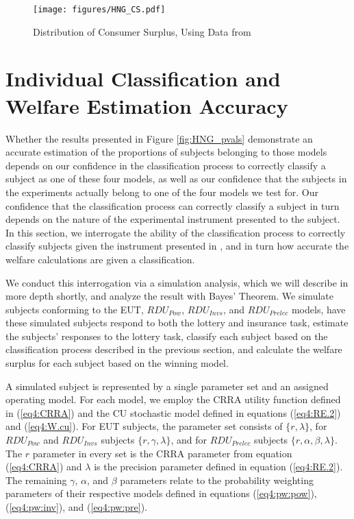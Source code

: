 \documentclass[11pt,a4paper]{report}
\newcommand{\onlyinsubfile}[1]{#1}
\newcommand{\notinsubfile}[1]{}
\begin{document}
\begin{figure}[h!]
	\center
	\caption{Distribution of Consumer Surplus, Using Data from \textcite{Harrison2016}}
	\onlyinsubfile{
		\texttt{[image: figures/HNG\_CS.pdf]}
	}
	\notinsubfile{
		\texttt{[image: ch4/figures/HNG\_CS.pdf]}
	}
	\label{fig:HNG_CS}
\end{figure}

\section{Individual Classification and Welfare Estimation Accuracy}

Whether the results presented in Figure \ref{fig:HNG_pvals} demonstrate an accurate estimation of the proportions of subjects belonging to those models depends on our confidence in the classification process to correctly classify a subject as one of these four models, as well as our confidence that the subjects in the experiments actually belong to one of the four models we test for.
Our confidence that the classification process can correctly classify a subject in turn depends on the nature of the experimental instrument presented to the subject.
In this section, we interrogate the ability of the classification process to correctly classify subjects given the instrument presented in \textcite{Harrison2016}, and in turn how accurate the welfare calculations are given a classification.

We conduct this interrogation via a simulation analysis, which we will describe in more depth shortly, and analyze the result with Bayes' Theorem.
We simulate subjects conforming to the EUT, $\mathit{RDU_{Pow}}$, $\mathit{RDU_{Invs}}$, and $\mathit{RDU_{Prelec}}$ models, have these simulated subjects respond to both the lottery and insurance task, estimate the subjects' responses to the lottery task, classify each subject based on the classification process described in the previous section, and calculate the welfare surplus for each subject based on the winning model.

A simulated subject is represented by a single parameter set and an assigned operating model.
For each model, we employ the CRRA utility function defined in (\ref{eq4:CRRA}) and the CU stochastic model defined in equations (\ref{eq4:RE.2}) and (\ref{eq4:W.cu}).
For EUT subjects, the parameter set consists of $\lbrace r, \lambda \rbrace$, for $\mathit{RDU_{Pow}}$ and $\mathit{RDU_{Invs}}$ subjects $\lbrace r, \gamma, \lambda \rbrace$, and for $\mathit{RDU_{Prelec}}$ subjects $\lbrace r, \alpha, \beta, \lambda \rbrace$.
The $r$ parameter in every set is the CRRA parameter from equation (\ref{eq4:CRRA}) and $\lambda$ is the precision parameter defined in equation (\ref{eq4:RE.2}).
The remaining $\gamma$, $\alpha$, and $\beta$ parameters relate to the probability weighting parameters of their respective models defined in equations (\ref{eq4:pw:pow}), (\ref{eq4:pw:inv}), and (\ref{eq4:pw:pre}).
\end{document}

